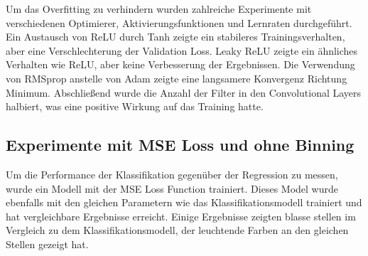 Um das Overfitting zu verhindern wurden zahlreiche Experimente mit verschiedenen Optimierer, Aktivierungsfunktionen und Lernraten durchgeführt.
Ein Austausch von ReLU durch Tanh zeigte ein stabileres Trainingsverhalten, aber eine Verschlechterung der Validation Loss. Leaky ReLU zeigte 
ein ähnliches Verhalten wie ReLU, aber keine Verbesserung der Ergebnissen. Die Verwendung von RMSprop anstelle von Adam zeigte eine langsamere Konvergenz Richtung Minimum.
Abschließend wurde die Anzahl der Filter in den Convolutional Layers halbiert, was eine positive Wirkung auf das Training hatte.   

\subsection{Experimente mit MSE Loss und ohne Binning}
Um die Performance der Klassifikation gegenüber der Regression zu messen, wurde ein Modell mit der MSE Loss Function trainiert. Dieses Model
wurde ebenfalls mit den gleichen Parametern wie das Klassifikationsmodell trainiert und hat vergleichbare Ergebnisse erreicht. Einige Ergebnisse
zeigten blasse stellen im Vergleich zu dem Klassifikationsmodell, der leuchtende Farben an den gleichen Stellen gezeigt hat.

